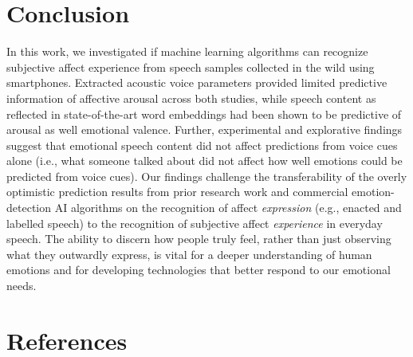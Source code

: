 \documentclass[
  english,
  man,floatsintext]{apa6}
\begin{document}
\hypertarget{conclusion}{%
\section{Conclusion}\label{conclusion}}

In this work, we investigated if machine learning algorithms can recognize subjective affect experience from speech samples collected in the wild using smartphones. Extracted acoustic voice parameters provided limited predictive information of affective arousal across both studies, while speech content as reflected in state-of-the-art word embeddings had been shown to be predictive of arousal as well emotional valence. Further, experimental and explorative findings suggest that emotional speech content did not affect predictions from voice cues alone (i.e., what someone talked about did not affect how well emotions could be predicted from voice cues). Our findings challenge the transferability of the overly optimistic prediction results from prior research work and commercial emotion-detection AI algorithms on the recognition of affect \emph{expression} (e.g., enacted and labelled speech) to the recognition of subjective affect \emph{experience} in everyday speech. The ability to discern how people truly feel, rather than just observing what they outwardly express, is vital for a deeper understanding of human emotions and for developing technologies that better respond to our emotional needs.

\newpage

\hypertarget{references}{%
\section{References}\label{references}}
\end{document}
